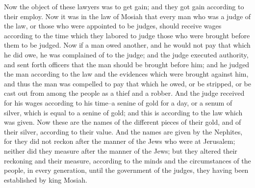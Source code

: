 Now the object of these lawyers was to get gain; and they got gain according to their employ.
\bchapter
\bverse \iffalse Now it was in the law of Mosiah that every man who was a judge of the law, or those who were appointed to be judges, should receive wages according to the time which they labored to judge those who were brought before them to be judged. \fi
Now it was in the law of Mosiah that every man who was a judge of the law, or those who were appointed to be judges, should receive wages according to the time which they labored to judge those who were brought before them to be judged.
\bverse \iffalse Now if a man owed another, and he would not pay that which he did owe, he was complained of to the judge; and the judge executed authority, and sent forth officers that the man should be brought before him; and he judged the man according to the law and the evidences which were brought against him, and thus the man was compelled to pay that which he owed, or be stripped, or be cast out from among the people as a thief and a robber. \fi
Now if a man owed another, and he would not pay that which he did owe, he was complained of to the judge; and the judge executed authority, and sent forth officers that the man should be brought before him; and he judged the man according to the law and the evidences which were brought against him, and thus the man was compelled to pay that which he owed, or be stripped, or be cast out from among the people as a thief and a robber.
\bverse \iffalse And the judge received for his wages according to his time--a senine of gold for a day, or a senum of silver, which is equal to a senine of gold; and this is according to the law which was given. \fi
And the judge received for his wages according to his time--a senine of gold for a day, or a senum of silver, which is equal to a senine of gold; and this is according to the law which was given.
\bverse \iffalse Now these are the names of the different pieces of their gold, and of their silver, according to their value. And the names are given by the Nephites, for they did not reckon after the manner of the Jews who were at Jerusalem; neither did they measure after the manner of the Jews; but they altered their reckoning and their measure, according to the minds and the circumstances of the people, in every generation, until the reign of the judges, they having been established by king Mosiah. \fi
Now these are the names of the different pieces of their gold, and of their silver, according to their value. And the names are given by the Nephites, for they did not reckon after the manner of the Jews who were at Jerusalem; neither did they measure after the manner of the Jews; but they altered their reckoning and their measure, according to the minds and the circumstances of the people, in every generation, until the government of the judges, they having been established by king Mosiah.
